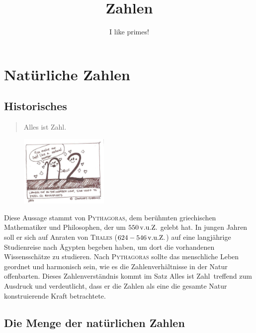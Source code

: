 \documentclass[%
11pt,%
twoside,%
titlepage,%
swissgerman,%
headsepline%
]{scrartcl}
\title{Zahlen}
\subtitle{I like primes!}
\author{}
\date{}
\theoremstyle{definition}
\theoremstyle{plain}
\begin{document}
\maketitle
\tableofcontents
\cleardoublepage


\section{Natürliche Zahlen}
\subsection{Historisches}
\begin{quote}
Alles ist Zahl.
\end{quote}

\begin{figure}
\vspace{-22pt}
  \begin{center}
    \includegraphics[width=0.38\textwidth]{pictures/zahln}
  \end{center}
\vspace{-22pt}
\end{figure}
Diese Aussage stammt von \textsc{Pythagoras}, dem berühmten griechischen Mathematiker und Philosophen, der um $\unit[550]{v.u.Z.}$ gelebt hat. In jungen Jahren soll er sich auf Anraten von \textsc{Thales} ($\unit[624-546]{v.u.Z.}$) auf eine langjährige Studienreise nach Ägypten begeben haben, um dort die vorhandenen Wissensschätze zu studieren. Nach \textsc{Pythagoras} sollte das menschliche Leben geordnet und harmonisch sein, wie es die Zahlenverhältnisse in der Natur offenbarten. Dieses Zahlenverständnis kommt im Satz \glqq Alles ist Zahl\grqq\ treffend zum Ausdruck und verdeutlicht, dass er die Zahlen als eine die gesamte Natur konstruierende Kraft betrachtete.

\subsection{Die Menge der natürlichen Zahlen}
\end{document}

